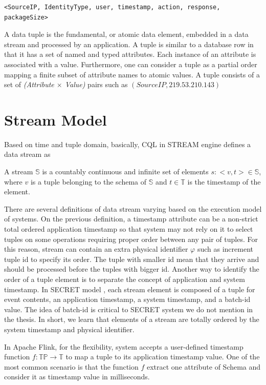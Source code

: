 \begin{verbatim}
<SourceIP, IdentityType, user, timestamp, action, response, packageSize>
\end{verbatim}

A data tuple is the fundamental, or atomic data element, embedded in a data stream and processed by an application. A tuple is similar to a database row in that it has a set of named and typed attributes. Each instance of an attribute is associated with a value\citep{Henrique:2014}. Furthermore, one can consider a tuple as a partial order mapping a finite subset of attribute names to atomic values\citep{Petit:2012}. A tuple consists of a set of \textit{(Attribute $\times$ Value)} pairs such as $(SourceIP, 219.53.210.143)$


\section{Stream Model}


Based on time and tuple domain, basically, CQL in STREAM engine\citep{Arasu:2006} defines a data stream as
\begin{defi}
	A stream $\mathbb{S}$ is a countably continuous and infinite set of elements $s:<v,t> \in \mathbb{S}$, where $v$ is a tuple belonging to the schema of $\mathbb{S}$ and $t \in \mathbb{T}$ is the timestamp of the element. 
\end{defi}

There are several definitions of data stream varying based on the execution model of systems. On the previous definition, a timestamp attribute can be a non-strict total ordered application timestamp so that system may not rely on it to select tuples on some operations requiring proper order between any pair of tuples. For this reason, stream can contain an extra physical identifier  $\varphi$ \citep{Petit:2010} such as increment tuple id to specify its order. The tuple with smaller id mean that they arrive and should be processed before the tuples with bigger id. Another way to identify the order of a tuple element is to separate the concept of application and system timestamp. In SECRET model \citep{Dindar:2013}, each stream element is composed of a tuple for event contents, an application timestamp, a system timestamp, and a batch-id value. The idea of batch-id is critical to SECRET system we do not mention in the thesis.
In short, we learn that elements of a stream are totally ordered by the system timestamp and physical identifier.

In Apache Flink, for the flexibility, system accepts a user-defined timestamp function   $f: \mathbb{TP} \rightarrow \mathbb{T}$ to map a tuple to its application timestamp value. One of the most common scenario is that the function $f$ extract one attribute of Schema and consider it as timestamp value in milliseconds.

